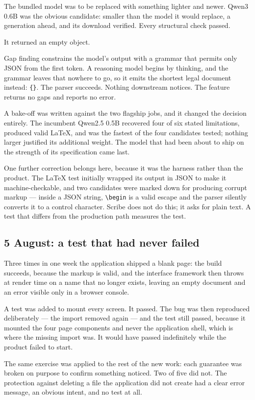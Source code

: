 \documentclass[11pt,a4paper]{article}
\begin{document}
The bundled model was to be replaced with something lighter and newer. Qwen3
0.6B was the obvious candidate: smaller than the model it would replace, a
generation ahead, and its download verified. Every structural check passed.

It returned an empty object.

Gap finding constrains the model's output with a grammar that permits only JSON
from the first token. A reasoning model begins by thinking, and the grammar
leaves that nowhere to go, so it emits the shortest legal document instead:
\texttt{\{\}}. The parser succeeds. Nothing downstream notices. The feature
returns no gaps and reports no error.

A bake-off was written against the two flagship jobs, and it changed the
decision entirely. The incumbent Qwen2.5 0.5B recovered four of six stated
limitations, produced valid LaTeX, and was the fastest of the four candidates
tested; nothing larger justified its additional weight. The model that had been
about to ship on the strength of its specification came last.

One further correction belongs here, because it was the harness rather than the
product. The LaTeX test initially wrapped its output in JSON to make it
machine-checkable, and two candidates were marked down for producing corrupt
markup --- inside a JSON string, \verb|\begin| is a valid escape and the parser
silently converts it to a control character. Scribe does not do this; it asks
for plain text. A test that differs from the production path measures the test.

\subsection{5 August: a test that had never failed}

Three times in one week the application shipped a blank page: the build
succeeds, because the markup is valid, and the interface framework then throws
at render time on a name that no longer exists, leaving an empty document and
an error visible only in a browser console.

A test was added to mount every screen. It passed. The bug was then reproduced
deliberately --- the import removed again --- and the test still passed, because
it mounted the four page components and never the application shell, which is
where the missing import was. It would have passed indefinitely while the
product failed to start.

The same exercise was applied to the rest of the new work: each guarantee was
broken on purpose to confirm something noticed. Two of five did not. The
protection against deleting a file the application did not create had a clear
error message, an obvious intent, and no test at all.
\end{document}
